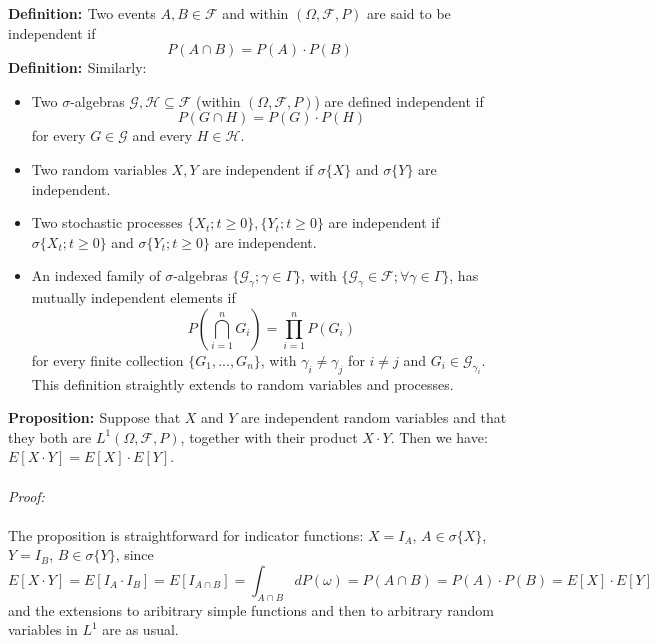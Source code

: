 \documentclass[a4paper,10pt]{report}
\theoremstyle{plain}
\theoremstyle{definition}
\newcommand{\DEF} {{\bf{Definition: }}}
\newcommand{\PROP} {{\bf{Proposition: }}}
\newcommand{\PROOF} {{\emph{Proof: \\ \\}}}
\newcommand{\SAs} {{$\sigma$-algebras} }
\newcommand{\FF} {\mathcal{F} }
\begin{document}
\DEF Two events $A,B\in \FF$ and within $(\Omega, \FF, P)$ are said to be independent if 
\[
P(A \cap B)=P(A)\cdot P(B)
\]
\DEF Similarly:
\begin{itemize}

\item Two \SAs $\mathcal{G}, \mathcal{H}\subseteq \FF$ (within $(\Omega, \FF, P)$) are defined independent if 
\[
P(G \cap H)=P(G)\cdot P(H)
\]
for every $G\in \mathcal{G}$ and every  $H\in \mathcal{H}$.
\item Two random variables $X, Y$ are independent if $\sigma\{X\}$ and $\sigma\{Y\}$ are independent.
\item Two stochastic processes $\{X_t; t\ge 0\}, \{Y_t; t\ge 0\}$ are independent if $\sigma\{X_t; t\ge 0\}$ and $\sigma\{Y_t; t\ge 0\}$ are independent.
\item An indexed family of \SAs $\{\mathcal{G}_\gamma; \gamma\in \Gamma\}$, with $\{\mathcal{G}_\gamma\in \FF;\forall \gamma\in \Gamma\}$, has mutually independent elements if 
\[
P\left(\bigcap_{i=1}^n G_i\right)=\prod_{i=1}^n P(G_i)
\]
for every finite collection $\{G_1,...,G_n\}$, with $\gamma_i\neq \gamma_j$ for $i\neq j$ and $G_i\in \mathcal{G}_{\gamma_i}$. This definition straightly extends to random variables and processes.
\end{itemize}
\PROP Suppose that $X$ and $Y$ are independent random variables and that they both are $L^1(\Omega, \FF, P)$, together with their product $X\cdot Y$. Then we have: $E[X\cdot Y]=E[X]\cdot E[Y]$.\\ \\ 
\PROOF
The proposition is straightforward for indicator functions: $X=I_A$, $A\in \sigma\{X\}$, $Y=I_B$, $B\in \sigma\{Y\}$, since
\[
E[X\cdot Y]=E[I_A\cdot I_B]=E[I_{A\cap B}]=\int_{A\cap B}dP(\omega)=P(A\cap B)=P(A)\cdot P(B)=E[X]\cdot E[Y]
\]
and the extensions to aribitrary simple functions and then to arbitrary random variables in $L^1$ are as usual.
\end{document}
